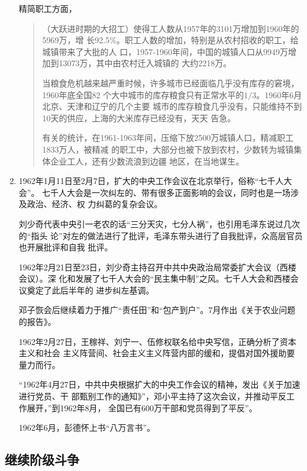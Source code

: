 \begin{enumerate}
  精简职工方面，
  \begin{quotation}
    （大跃进时期的大招工）使得工人数从1957年的3101万增加到1960年的5969万，增
    长92.5\%。职工人数的增加，特别是从农村招收的职工，给城镇带来了大批的人
    口，1957-1960年间，中国的城镇人口从9949万增加到13073万，其中由农村迁入城镇的
    大约2218万。

    当粮食危机越来越严重时候，许多城市已经面临几乎没有库存的窘境，1960年底全国82
    个大中城市的库存粮食只有正常水平的$1/3$。1960年6月北京、天津和辽宁的几个主要
    城市的库存粮食几乎没有，只能维持不到10天的供应，上海的大米库存已经没有，天天
    告急。

    有关的统计，在1961-1963年间，压缩下放2500万城镇人口，精减职工1833万人，被精减
    的职工中，大部分也被下放到农村，少数转为城镇集体企业工人，还有少数流浪到边疆
    地区，在当地谋生。\cite{jingjianzhigong}
  \end{quotation}

\item 1962年1月11日至2月7日，扩大的中央工作会议在北京举行，俗称``七千人大会''。
  七千人大会是一次纠左的、带有很多正面影响的会议，同时也是一场涉及政治、经济、权
  力纠葛的复杂会议。

  刘少奇代表中央引一老农的话``三分天灾，七分人祸''，也引用毛泽东说过几次的“指头
  论”对左的做法进行了批评，毛泽东带头进行了自我批评，众高层官员也开展批评和自我
  批评。

  1962年2月21日至23日，刘少奇主持召开中共中央政治局常委扩大会议（西楼会议）。深
  化和发展了七千人大会的``民主集中制''之风。七千人大会和西楼会议奠定了此后半年的
  进步纠左基调。

  邓子恢会后继续着力于推广``责任田''和``包产到户''。7月作出《关于农业问题的报告》。
  
  1962年2月27日，王稼祥、刘宁一、伍修权联名给中央写信，正确分析了资本主义和社会
  主义阵营间、社会主义主义阵营内部的缓和，提倡对国外援助要量力而行。
  
  ``1962年4月27日，中共中央根据扩大的中央工作会议的精神，发出《关于加速进行党员、干
  部甄别工作的通知》''，邓小平主持了这次会议，并推动平反工作展开，''到1962年8月，
  全国已有600万干部和党员得到了平反''。

  1962年6月，彭德怀上书“八万言书”。

\end{enumerate}

\subsection{继续阶级斗争}


